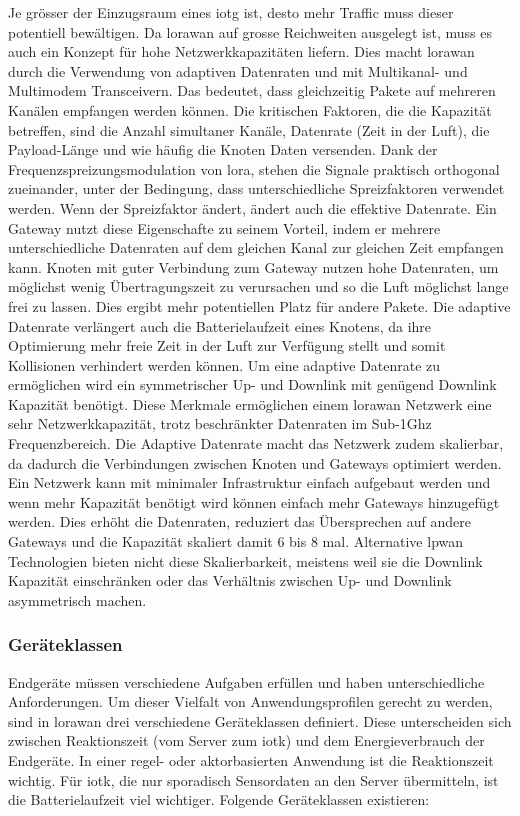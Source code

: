 Je grösser der Einzugsraum eines \gls{iotg} ist, desto mehr Traffic muss dieser potentiell bewältigen. Da \gls{lorawan} auf grosse Reichweiten ausgelegt ist, muss es auch ein Konzept für hohe Netzwerkkapazitäten liefern. Dies macht \gls{lorawan} durch die Verwendung von adaptiven Datenraten und mit Multikanal- und Multimodem Transceivern. Das bedeutet, dass gleichzeitig Pakete auf mehreren Kanälen empfangen werden können. Die kritischen Faktoren, die die Kapazität betreffen, sind die Anzahl simultaner Kanäle, Datenrate (Zeit in der Luft), die Payload-Länge und wie häufig die Knoten Daten versenden. Dank der Frequenzspreizungsmodulation von \gls{lora}, stehen die Signale praktisch orthogonal zueinander, unter der Bedingung, dass unterschiedliche Spreizfaktoren verwendet werden. Wenn der Spreizfaktor ändert, ändert auch die effektive Datenrate. Ein Gateway nutzt diese Eigenschafte zu seinem Vorteil, indem er mehrere unterschiedliche Datenraten auf dem gleichen Kanal zur gleichen Zeit empfangen kann. Knoten mit guter Verbindung zum Gateway nutzen hohe Datenraten, um möglichst wenig Übertragungszeit zu verursachen und so die Luft möglichst lange frei zu lassen. Dies ergibt mehr potentiellen Platz für andere Pakete. Die adaptive Datenrate verlängert auch die Batterielaufzeit eines Knotens, da ihre Optimierung mehr freie Zeit in der Luft zur Verfügung stellt und somit Kollisionen verhindert werden können. Um eine adaptive Datenrate zu ermöglichen wird ein symmetrischer Up- und Downlink mit genügend Downlink Kapazität benötigt. Diese Merkmale ermöglichen einem \gls{lorawan} Netzwerk eine sehr Netzwerkkapazität, trotz beschränkter Datenraten im Sub-1Ghz Frequenzbereich. Die Adaptive Datenrate macht das Netzwerk zudem skalierbar, da dadurch die Verbindungen zwischen Knoten und Gateways optimiert werden. Ein Netzwerk kann mit minimaler Infrastruktur einfach aufgebaut werden und wenn mehr Kapazität benötigt wird können einfach mehr Gateways hinzugefügt werden. Dies erhöht die Datenraten, reduziert das Übersprechen auf andere Gateways und die Kapazität skaliert damit 6 bis 8 mal. Alternative \gls{lpwan} Technologien bieten nicht diese Skalierbarkeit, meistens weil sie die Downlink Kapazität einschränken oder das Verhältnis zwischen Up- und Downlink asymmetrisch machen.

\subsubsection*{Geräteklassen}

Endgeräte müssen verschiedene Aufgaben erfüllen und haben unterschiedliche Anforderungen. Um dieser Vielfalt von Anwendungsprofilen gerecht zu werden, sind in \gls{lorawan} drei verschiedene Geräteklassen definiert. Diese unterscheiden sich zwischen Reaktionszeit (vom Server zum \gls{iotk}) und dem Energieverbrauch der Endgeräte. In einer regel- oder aktorbasierten Anwendung ist die Reaktionszeit wichtig. Für \gls{iotk}, die nur sporadisch Sensordaten an den Server übermitteln, ist die Batterielaufzeit viel wichtiger. Folgende Geräteklassen existieren:

